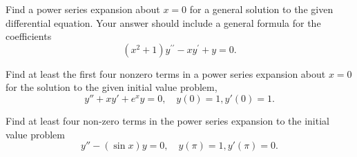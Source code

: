 \documentclass[11pt]{article}
\begin{document}
\begin{problem}
{ Find a power series expansion about $x =0$ for a general solution to the given differential equation. Your answer should include a general formula for the coefficients}
\begin{equation*}
(x^2+1)y^{\prime \prime} - x y^{\prime} + y =0.
\end{equation*}
\end{problem}




\begin{problem}
Find at least the first four nonzero terms in a power series expansion about $x=0$ for the solution to the given initial value problem,
\begin{equation*}
y'' + x y' + e^{x} y =0, \quad y(0) =1, y'(0)=1.
\end{equation*}
\end{problem}




\begin{problem}
Find at least four non-zero terms in the power series expansion to the initial value problem
\[y''-(\sin x) y = 0, \quad y(\pi)=1, y'(\pi)=0.\]
\end{problem}
 
 
 
 




% 
% 
% 
% 
% 
\end{document}
